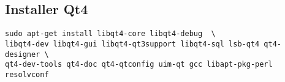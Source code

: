 % 
% 
% 
% 
% 
% 

\subsection{Installer Qt4}
\begin{verbatim}
sudo apt-get install libqt4-core libqt4-debug  \
libqt4-dev libqt4-gui libqt4-qt3support libqt4-sql lsb-qt4 qt4-designer \
qt4-dev-tools qt4-doc qt4-qtconfig uim-qt gcc libapt-pkg-perl resolvconf
\end{verbatim}

